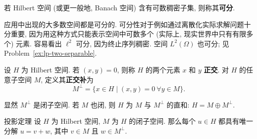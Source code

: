 \begin{Definition}
\label{def:separable-space}
若 Hilbert 空间 (或更一般地, Banach 空间) 含有可数稠密子集, 则称其\textbf{可分}.
\end{Definition}

应用中出现的大多数空间都是可分的. 可分性对于例如通过离散化实际求解问题十分重要, 因为用这种方式只能表示空间中可数多个 (实际上, 现实世界中只有有限多个) 元素. 容易看出 $\ell^2$ 可分, 因为终止序列稠密. 空间 $L^2(\Omega)$ 也可分; 见 Problem~\ref{ex:lp-two-separable}.

\begin{Definition}
\label{def:hilbert-orthogonal-complement}
设 $H$ 为 Hilbert 空间. 若 $(x,y)=0$, 则称 $H$ 的两个元素 $x$ 和 $y$ \textbf{正交}. 对 $H$ 的任意子空间 $M$, 定义其\textbf{正交补}为
\begin{equation}\label{eq:hilbert-subspace-orthogonal-complement}
M^\perp=\{x\in H\mid(x,y)=0\ \forall y\in M\}.
\end{equation}

\end{Definition}

显然 $M^\perp$ 是闭子空间. 若 $M$ 也闭, 则 $H$ 为 $M$ 与 $M^\perp$ 的直和: $H=M\oplus M^\perp$.

\begin{Theorem}{投影定理}
\label{thm:hilbert-orthogonal-projection}
设 $H$ 为 Hilbert 空间, $M$ 为 $H$ 的闭子空间. 那么每个 $u\in H$ 都具有唯一分解 $u=v+w$, 其中 $v\in M$ 且 $w\in M^\perp$.
\end{Theorem}

